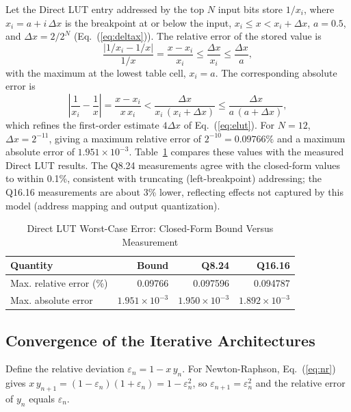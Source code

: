 \documentclass[manuscript,screen,review]{acmart}
\begin{document}
Let the Direct LUT entry addressed by the top $N$ input bits store $1/x_i$, where $x_i = a + i\,\Delta x$ is the breakpoint at or below the input, $x_i \le x < x_i + \Delta x$, $a = 0.5$, and $\Delta x = 2/2^{N}$ (Eq.~(\ref{eq:deltax})). The relative error of the stored value is
\begin{equation}
\frac{\left|1/x_i - 1/x\right|}{1/x} = \frac{x - x_i}{x_i} \le \frac{\Delta x}{x_i} \le \frac{\Delta x}{a},
\label{eq:app_lutrel}
\end{equation}
with the maximum at the lowest table cell, $x_i = a$. The corresponding absolute error is
\begin{equation}
\left|\frac{1}{x_i} - \frac{1}{x}\right| = \frac{x - x_i}{x\,x_i} < \frac{\Delta x}{x_i\,(x_i + \Delta x)} \le \frac{\Delta x}{a\,(a + \Delta x)},
\label{eq:app_lutabs}
\end{equation}
which refines the first-order estimate $4\Delta x$ of Eq.~(\ref{eq:elut}). For $N = 12$, $\Delta x = 2^{-11}$, giving a maximum relative error of $2^{-10} = 0.09766\%$ and a maximum absolute error of $1.951\times10^{-3}$. Table~\ref{tab:app_lutcheck} compares these values with the measured Direct LUT results. The Q8.24 measurements agree with the closed-form values to within 0.1\%, consistent with truncating (left-breakpoint) addressing; the Q16.16 measurements are about 3\% lower, reflecting effects not captured by this model (address mapping and output quantization).
 
\begin{table}[htbp]
\caption{Direct LUT Worst-Case Error: Closed-Form Bound Versus Measurement}
\label{tab:app_lutcheck}
\begin{tabular}{@{}lrrr@{}}
\toprule
\textbf{Quantity} & \textbf{Bound} & \textbf{Q8.24} & \textbf{Q16.16} \\
\midrule
Max. relative error (\%) & 0.09766 & 0.097596 & 0.094787 \\
Max. absolute error & $1.951\times10^{-3}$ & $1.950\times10^{-3}$ & $1.892\times10^{-3}$ \\
\bottomrule
\end{tabular}
\end{table}
 
\subsection{Convergence of the Iterative Architectures}
\label{app:convergence}
 
Define the relative deviation $\varepsilon_n = 1 - x\,y_n$. For Newton-Raphson, Eq.~(\ref{eq:nr}) gives $x\,y_{n+1} = (1-\varepsilon_n)(1+\varepsilon_n) = 1 - \varepsilon_n^2$, so $\varepsilon_{n+1} = \varepsilon_n^2$ and the relative error of $y_n$ equals $\varepsilon_n$.
 
\end{document}
